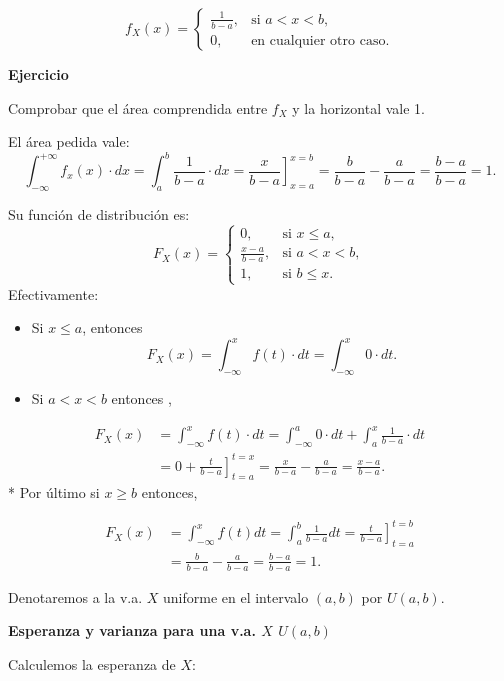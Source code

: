 \documentclass[]{book}
\providecommand{\tightlist}{%
  \setlength{\itemsep}{0pt}\setlength{\parskip}{0pt}}
\begin{document}
\[
f_X(x)=\left\{\begin{array}{ll}
\frac1{b-a}, & \mbox{si } a<x<b,\\ 0,  & \mbox{en cualquier otro caso.}
\end{array}
\right. 
\]

\textbf{Ejercicio}

Comprobar que el área comprendida entre \(f_X\) y la horizontal
vale 1.

El área pedida vale:
\[
\int_{-\infty}^{+\infty} f_x(x)\cdot dx=\int_{a}^{b} \frac{1}{b-a} \cdot dx=\left.\frac{x}{b-a}\right]_{x=a}^{x=b}=\frac{b}{b-a}-\frac{a}{b-a}=
\frac{b-a}{b-a}=1.
\]

Su función de distribución es:
\[
F_X(x)=\left\{\begin{array}{ll} 0,  & \mbox{si } x\leq a,\\
\frac{x-a}{b-a}, & \mbox{si } a<x<b,\\ 1,  & \mbox{si } b\leq x.
\end{array}
\right. 
\]
Efectivamente:

\begin{itemize}
\tightlist
\item
  Si \(x\leq a\), entonces
  \[F_X(x)=\int_{-\infty}^{x} f(t)\cdot dt= \int_{-\infty}^{x} 0\cdot dt.\]
\item
  Si \(a<x<b\) entonces ,
\end{itemize}

\[
\begin{array}{rl}
F_X(x)&=\displaystyle\int_{-\infty}^{x} f(t)\cdot dt= \int_{-\infty}^{a} 0\cdot dt+\int_{a}^{x} \frac1{b-a} \cdot dt\\
&= \displaystyle 0 +\left.\frac{t}{b-a}\right]_{t=a}^{t=x}= \frac{x}{b-a}-\frac{a}{b-a}=\frac{x-a}{b-a}.
\end{array}
\]
* Por último si \(x\geq b\) entonces,

\[
\begin{array}{rl}
F_X(x)&=\displaystyle\int_{-\infty}^{x} f(t) dt=\int_{a}^{b} \frac{1}{b-a} dt=
  \left.  \frac{t}{b-a} \right]_{t=a}^{t=b}
\\&=\displaystyle \frac{b}{b-a}-\frac{a}{b-a}=\frac{b-a}{b-a}=1.
\end{array}
\]

Denotaremos a la v.a. \(X\) uniforme en el intervalo \((a,b)\) por \(U(a,b)\).

\textbf{Esperanza y varianza para una v.a. \(X\) \(U(a,b)\)}

Calculemos la esperanza de \(X\):
\end{document}
